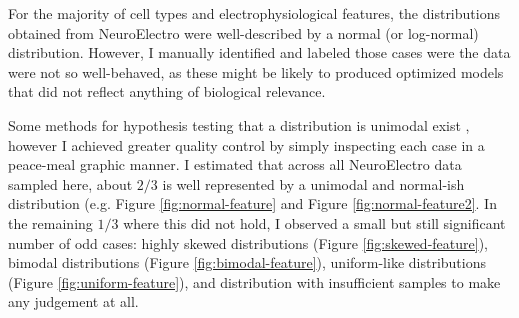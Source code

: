 
%

%    
%
%
%

%
For the majority of cell types and electrophysiological features, the distributions obtained from NeuroElectro were well-described by a normal (or log-normal) distribution.
However, I manually identified and labeled those cases were the data were not so well-behaved, as these might be likely to produced optimized models that did not reflect anything of biological relevance.

Some methods for hypothesis testing that a distribution is unimodal exist \citep{maechler2013package}, however I achieved greater quality control by simply inspecting each case in a peace-meal graphic manner. %
I estimated that across all NeuroElectro data sampled here, about $2/3$ is well represented by a unimodal and normal-ish distribution (e.g. Figure \ref{fig:normal-feature} and Figure \ref{fig:normal-feature2}.
In the remaining $1/3$ where this did not hold, I observed a small but still significant number of odd cases: highly skewed distributions (Figure \ref{fig:skewed-feature}), bimodal distributions (Figure \ref{fig:bimodal-feature}), uniform-like distributions (Figure \ref{fig:uniform-feature}), and distribution with insufficient samples to make any judgement at all.

